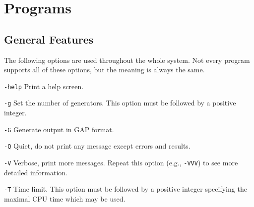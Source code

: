 
\chapter{Programs} \label{chap:progs}
\def\myparagraph#1{\subsubsection*{\sc #1}}
\def\Syntax{\myparagraph{Usage}}
\def\Description{\myparagraph{Description}}
\def\Examples{\myparagraph{Examples}}
\def\Bugs{\myparagraph{Bugs}}
\def\Limits{\myparagraph{Limits}}
\def\Messages{\myparagraph{Messages}}
\def\Implementation{\myparagraph{Implementation}}
\def\SeeAlso{\myparagraph{See Also}}

\def\Typeout#1{}


\section{General Features}

The following options are used throughout the whole {\MeatAxe}
system. Not every program supports all of these options, but
the meaning is always the same.
\begin{list}{}{\leftmargin 1cm
\parsep 0mm\itemsep 0mm}
\item[{\tt -help}\hfill]
    Print a help screen.
\item[{\tt -g}\hfill]
    Set the number of generators. This option must be followed
    by a positive integer.
\item[{\tt -G}\hfill]
    Generate output in GAP format.
\item[{\tt -Q}\hfill]
    Quiet, do not print any message except errors and results.
\item[{\tt -V}\hfill]
    Verbose, print more messages. Repeat this option (e.g.,
    {\tt -VVV}) to see more detailed information.
\item[{\tt -T}\hfill]
    Time limit. This option must be followed by a positive
    integer specifying the maximal CPU time which may be used.
\end{list}



